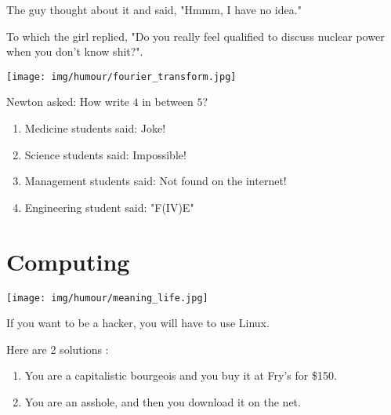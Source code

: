 The guy thought about it and said, "Hmmm, I have no idea."

To which the girl replied, "Do you really feel qualified to discuss nuclear power when you don't know shit?".

\begin{center}\underline{\hspace{5 cm}}\end{center}
	\begin{center}
	\texttt{[image: img/humour/fourier\_transform.jpg]}
	\end{center}
\begin{center}\underline{\hspace{5 cm}}\end{center}

Newton asked: How write $4$ in between $5$?

\begin{enumerate}
	\item Medicine students said: Joke!
	
	\item Science students said: Impossible!
	
	\item Management students said: Not found on the internet!
	
	\item Engineering student said: "F(IV)E"
\end{enumerate}

	\pagebreak
	\section{Computing}

	\begin{center}
	\texttt{[image: img/humour/meaning\_life.jpg]}
	\end{center}
\begin{center}\underline{\hspace{5 cm}}\end{center}	

If you want to be a hacker, you will have to use Linux.

Here are 2 solutions :
\begin{enumerate}
	\item You are a capitalistic bourgeois and you buy it at Fry's for \$150.
	\item You are an asshole, and then you download it on the net.
\end{enumerate}

